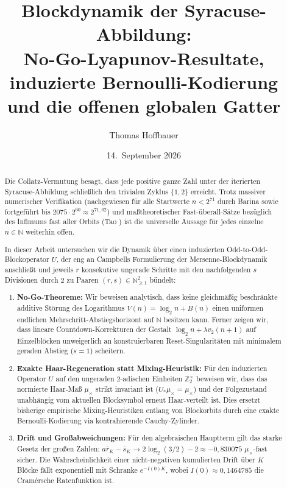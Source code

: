 \documentclass[11pt,reqno]{amsart}
\title{\textbf{\texorpdfstring{
Blockdynamik der Syracuse-Abbildung:\\
No-Go-Lyapunov-Resultate, induzierte Bernoulli-Kodierung\\
und die offenen globalen Gatter
}{
Blockdynamik der Syracuse-Abbildung:
No-Go-Lyapunov-Resultate, induzierte Bernoulli-Kodierung
und die offenen globalen Gatter
}}}
\author{Thomas Hoffbauer}
\date{14.~September 2026}
\theoremstyle{definition}
\theoremstyle{remark}
\numberwithin{equation}{section}
\begin{document}
\maketitle

\begin{abstract}
Die Collatz-Vermutung besagt, dass jede positive ganze Zahl unter der iterierten Syracuse-Abbildung schlie\ss{}lich den trivialen Zyklus $\{1, 2\}$ erreicht. Trotz massiver numerischer Verifikation (nachgewiesen f\"ur alle Startwerte $n < 2^{71}$ durch Barina \cite{Barina2025} sowie fortgef\"uhrt bis $2075 \cdot 2^{60} \approx 2^{71{,}02}$) und ma\ss{}theoretischer Fast-\"uberall-S\"atze bez\"uglich des Infimums fast aller Orbits (Tao \cite{Tao2019}) ist die universelle Aussage f\"ur jedes einzelne $n \in \mathbb{N}$ weiterhin offen.

In dieser Arbeit untersuchen wir die Dynamik \"uber einen induzierten Odd-to-Odd-Blockoperator $U$, der eng an Campbells Formulierung der Mersenne-Blockdynamik \cite{Campbell2025} anschlie\ss{}t und jeweils $r$ konsekutive ungerade Schritte mit den nachfolgenden $s$ Divisionen durch 2 zu Paaren $(r, s) \in \mathbb{N}_{\ge1}^2$ b\"undelt:
\begin{enumerate}
\item \textbf{No-Go-Theoreme:} Wir beweisen analytisch, dass keine gleichm\"a\ss{}ig beschr\"ankte additive St\"orung des Logarithmus $V(n) = \log_2 n + B(n)$ einen uniformen endlichen Mehrschritt-Abstiegshorizont auf $\mathbb{N}$ besitzen kann. Ferner zeigen wir, dass lineare Countdown-Korrekturen der Gestalt $\log_2 n + \lambda v_2(n+1)$ auf Einzelbl\"ocken unweigerlich an konstruierbaren Reset-Singularit\"aten mit minimalem geraden Abstieg ($s=1$) scheitern.
\item \textbf{Exakte Haar-Regeneration statt Mixing-Heuristik:} F\"ur den induzierten Operator $U$ auf den ungeraden $2$-adischen Einheiten $\mathbb{Z}_2^\times$ beweisen wir, dass das normierte Haar-Ma\ss{} $\mu_\times$ strikt invariant ist ($U_* \mu_\times = \mu_\times$) und der Folgezustand unabh\"angig vom aktuellen Blocksymbol erneut Haar-verteilt ist. Dies ersetzt bisherige empirische Mixing-Heuristiken entlang von Blockorbits durch eine exakte Bernoulli-Kodierung via kontrahierende Cauchy-Zylinder.
\item \textbf{Drift und Gro\ss{}abweichungen:} F\"ur den algebraischen Hauptterm gilt das starke Gesetz der gro\ss{}en Zahlen: $a\bar{r}_K - \bar{s}_K \to 2\log_2(3/2) - 2 \approx -0{,}830075$ $\mu_\times$-fast sicher. Die Wahrscheinlichkeit einer nicht-negativen kumulierten Drift \"uber $K$ Bl\"ocke f\"allt exponentiell mit Schranke $e^{-I(0) K}$, wobei $I(0) \approx 0{,}1464785$ die Cram\'ersche Ratenfunktion ist.

\end{enumerate}
\end{abstract}
\end{document}
